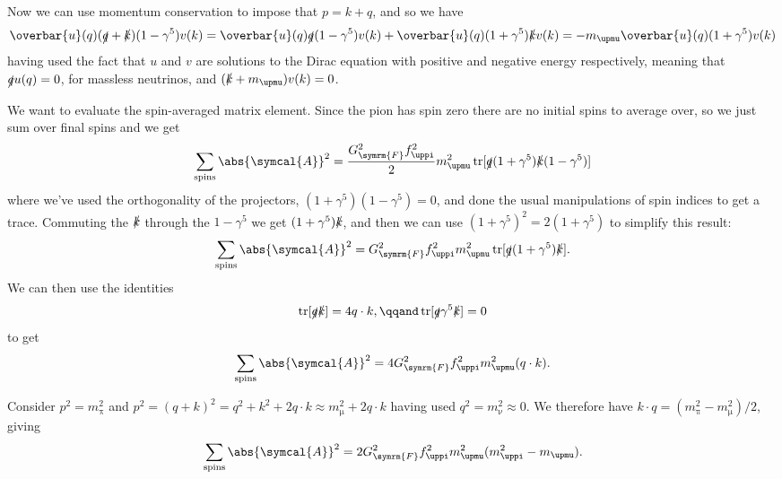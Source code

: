 \documentclass[fleqn]{NotesClass}
\newcommand{\Pmux}{\ensuremath{\upmu}}
\newcommand{\Pnu}{\ensuremath{\upnu}}
\newcommand{\Ppi}{\ensuremath{\uppi}}
\newcommand{\diracadjoint}[1]{\overbar{#1}}
\newcommand{\amplitude}{\symcal{A}}
\DeclareMathOperator{\tr}{tr}
\newcommand{\fermiConst}{G_{\symrm{F}}}
\begin{document}
    Now we can use momentum conservation to impose that \(p = k + q\), and so we have
    \begin{equation}
        \diracadjoint{u}(q)(\slashed{q} + \slashed{k})(1 - \gamma^5)v(k) = \diracadjoint{u}(q)\slashed{q}(1 - \gamma^5)v(k) + \diracadjoint{u}(q)(1 + \gamma^5)\slashed{k}v(k) = -m_{\Pmux}\diracadjoint{u}(q)(1 + \gamma^5)v(k)
    \end{equation}
    having used the fact that \(u\) and \(v\) are solutions to the Dirac equation with positive and negative energy respectively, meaning that \(\slashed{q}u(q) = 0\), for massless neutrinos, and \((\slashed{k} + m_{\Pmux})v(k) = 0\).
    
    We want to evaluate the spin-averaged matrix element.
    Since the pion has spin zero there are no initial spins to average over, so we just sum over final spins and we get
    \begin{equation}
        \sum_{\text{spins}} \abs{\amplitude}^2 = \frac{\fermiConst^2f_{\Ppi}^2}{2} m_{\Pmux}^2 \tr[\slashed{q}(1 + \gamma^5)\slashed{k}(1 - \gamma^5)]
    \end{equation}
    where we've used the orthogonality of the projectors, \((1 + \gamma^5)(1 - \gamma^5) = 0\), and done the usual manipulations of spin indices to get a trace.
    Commuting the \(\slashed{k}\) through the \(1 - \gamma^5\) we get \((1 + \gamma^5)\slashed{k}\), and then we can use \((1 + \gamma^5)^2 = 2(1 + \gamma^5)\) to simplify this result:
    \begin{equation}
        \sum_{\text{spins}} \abs{\amplitude}^2 = \fermiConst^2 f_{\Ppi}^2 m_{\Pmux}^2 \tr[\slashed{q}(1 + \gamma^5)\slashed{k}].
    \end{equation}
    We can then use the identities
    \begin{equation}
        \tr[\slashed{q}\slashed{k}] = 4q \cdot k, \qqand \tr[\slashed{q}\gamma^5\slashed{k}] = 0
    \end{equation}
    to get
    \begin{equation}
        \sum_{\text{spins}} \abs{\amplitude}^2 = 4\fermiConst^2 f_{\Ppi}^2 m_{\Pmux}^2 (q \cdot k).
    \end{equation}
    
    Consider \(p^2 = m_{\Ppi}^2\) and \(p^2 = (q + k)^2 = q^2 + k^2 + 2q \cdot k \approx m_{\Pmux}^2 + 2q\cdot k\) having used \(q^2 = m_{\Pnu}^2 \approx 0\).
    We therefore have \(k \cdot q = (m_{\Ppi}^2 - m_{\Pmux}^2)/2\), giving
    \begin{equation}
        \sum_{\text{spins}} \abs{\amplitude}^2 = 2\fermiConst^2 f_{\Ppi}^2 m_{\Pmux}^2(m_{\Ppi}^2 - m_{\Pmux}).
    \end{equation}
    
\end{document}
